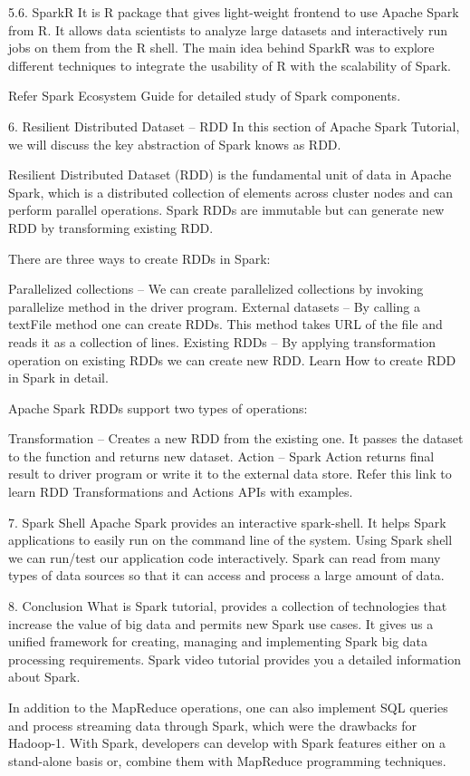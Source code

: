 5.6. SparkR
It is R package that gives light-weight frontend to use Apache Spark from R. It allows data scientists to analyze large datasets and interactively run jobs on them from the R shell. The main idea behind SparkR was to explore different techniques to integrate the usability of R with the scalability of Spark.

Refer Spark Ecosystem Guide for detailed study of Spark components.

6. Resilient Distributed Dataset – RDD
In this section of Apache Spark Tutorial, we will discuss the key abstraction of Spark knows as RDD.

Resilient Distributed Dataset (RDD) is the fundamental unit of data in Apache Spark, which is a distributed collection of elements across cluster nodes and can perform parallel operations. Spark RDDs are immutable but can generate new RDD by transforming existing RDD.

There are three ways to create RDDs in Spark:

Parallelized collections – We can create parallelized collections by invoking parallelize method in the driver program.
External datasets – By calling a textFile method one can create RDDs. This method takes URL of the file and reads it as a collection of lines.
Existing RDDs – By applying transformation operation on existing RDDs we can create new RDD.
Learn How to create RDD in Spark in detail.

Apache Spark RDDs support two types of operations:

Transformation – Creates a new RDD from the existing one. It passes the dataset to the function and returns new dataset.
Action – Spark Action returns final result to driver program or write it to the external data store.
Refer this link to learn RDD Transformations and Actions APIs with examples.

7. Spark Shell
Apache Spark provides an interactive spark-shell. It helps Spark applications to easily run on the command line of the system. Using Spark shell we can run/test our application code interactively. Spark can read from many types of data sources so that it can access and process a large amount of data.

8. Conclusion
What is Spark tutorial, provides a collection of technologies that increase the value of big data and permits new Spark use cases. It gives us a unified framework for creating, managing and implementing Spark big data processing requirements. Spark video tutorial provides you a detailed information about Spark.

In addition to the MapReduce operations, one can also implement SQL queries and process streaming data through Spark, which were the drawbacks for Hadoop-1. With Spark, developers can develop with Spark features either on a stand-alone basis or, combine them with MapReduce programming techniques.
